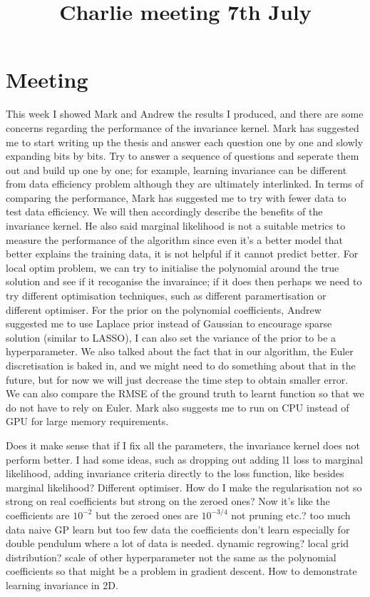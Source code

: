 \documentclass{article}
\title{\vspace{-3cm}Charlie meeting 7th July\vspace{-3em}}
\author{}
\date{}
\begin{document}
\maketitle
\section*{Meeting}
This week I showed Mark and Andrew the results I produced, and there are some concerns regarding the performance of the invariance kernel. 
Mark has suggested me to start writing up the thesis and answer each question one by one and slowly expanding bits by bits. 
Try to answer a sequence of questions and seperate them out and build up one by one; for example, learning invariance can be different from data efficiency problem although they are ultimately interlinked.  
In terms of comparing the performance, Mark has suggested me to try with fewer data to test data efficiency. 
We will then accordingly describe the benefits of the invariance kernel.
He also said marginal likelihood is not a suitable metrics to measure the performance of the algorithm since even it's a better model that better explains the training data, it is not helpful if it cannot predict better. 
For local optim problem, we can try to initialise the polynomial around the true solution and see if it recoganise the invaraince; if it does then perhaps we need to try different optimisation techniques, such as different paramertisation or different optimiser. 
For the prior on the polynomial coefficients, Andrew suggested me to use Laplace prior instead of Gaussian to encourage sparse solution (similar to LASSO), I can also set the variance of the prior to be a hyperparameter.
We also talked about the fact that in our algorithm, the Euler discretisation is baked in, and we might need to do something about that in the future, but for now we will just decrease the time step to obtain smaller error. 
We can also compare the RMSE of the ground truth to learnt function so that we do not have to rely on Euler.
Mark also suggests me to run on CPU instead of GPU for large memory requirements.

Does it make sense that if I fix all the parameters, the invariance kernel does not perform better.
I had some ideas, such as dropping out adding l1 loss to marginal likelihood, adding invariance criteria directly to the loss function, like besides marginal likelihood? Different optimiser.
How do I make the regularisation not so strong on real coefficients but strong on the zeroed ones? Now it's like the coefficients are $10^{-2}$ but the zeroed ones are $10^{-3/4}$
not pruning etc.?
too much data naive GP learn but too few data the coefficients don't learn especially for double pendulum where a lot of data is needed.
dynamic regrowing?
local grid distribution?
scale of other hyperparameter not the same as the polynomial coefficients so that might be a problem in gradient descent.
How to demonstrate learning invariance in 2D.
\end{document}
